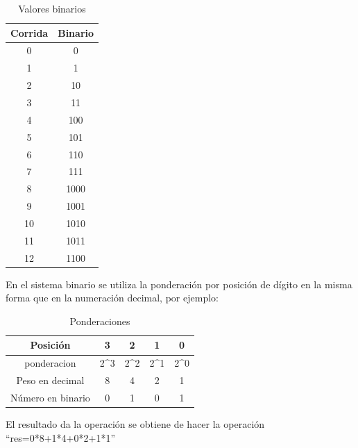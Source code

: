\documentclass{IEEEcsmag}
\begin{document}
\begin{table}[h]
     \centering
     \caption{Valores binarios}
     
     \begin{tabular}{|c|c|}
     \hline
        Corrida & Binario \\
        \hline
        0  & 0 \\
        \hline
        1  & 1 \\
        \hline
        2  & 10 \\
        \hline
        3  & 11 \\
        \hline
        4  & 100 \\
        \hline
        5  & 101 \\
        \hline
        6  & 110 \\
        \hline
        7  & 111 \\
        \hline
        8  & 1000 \\
        \hline
        9  & 1001 \\
        \hline
        10  & 1010 \\
        \hline
        11  & 1011 \\
        \hline
        12  & 1100 \\
        \hline
     \end{tabular}
     \label{tab:my_label}
 \end{table}

En el sistema binario se utiliza la ponderación por posición de dígito en la misma forma que en la numeración decimal, por ejemplo:

\begin{table}[h]
     \centering
     \caption{Ponderaciones}
     
     \begin{tabular}{|c|c|c|c|c|}
     \hline
        Posición & 3 & 2 & 1 & 0 \\
        \hline
        ponderacion  & 2^{3} & 2^{2} & 2^{1} & 2^{0} \\
        \hline
        Peso en decimal  & 8 & 4 & 2 & 1 \\
        \hline
        Número en binario  & 0 & 1 & 0 & 1 \\
        \hline
     \end{tabular}
     \label{tab:my_label}
 \end{table}

El resultado da la operación se obtiene de hacer la operación “res=0*8+1*4+0*2+1*1”
\end{document}
